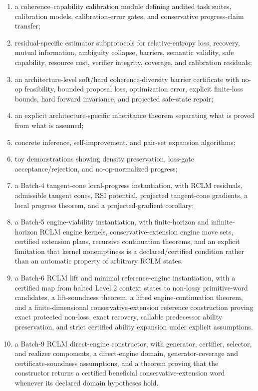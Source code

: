 \documentclass[11pt,a4paper]{article}
\begin{document}
\begin{enumerate}[label=(\arabic*),leftmargin=1.5em]
    \item a coherence--capability calibration module defining audited task suites, calibration models, calibration-error gates, and conservative progress-claim transfer;
    \item residual-specific estimator subprotocols for relative-entropy loss, recovery, mutual information, ambiguity collapse, barriers, semantic validity, safe capability, resource cost, verifier integrity, coverage, and calibration residuals;
    \item an architecture-level soft/hard coherence-diversity barrier certificate with no-op feasibility, bounded proposal loss, optimization error, explicit finite-loss bounds, hard forward invariance, and projected safe-state repair;
    \item an explicit architecture-specific inheritance theorem separating what is proved from what is assumed;
    \item concrete inference, self-improvement, and pair-set expansion algorithms;
    \item toy demonstrations showing density preservation, loss-gate acceptance/rejection, and no-op-normalized progress;
    \item a Batch-4 tangent-cone local-progress instantiation, with RCLM residuals, admissible tangent cones, RSI potential, projected tangent-cone gradients, a local progress theorem, and a projected-gradient corollary;
    \item a Batch-5 engine-viability instantiation, with finite-horizon and infinite-horizon RCLM engine kernels, conservative-extension engine move sets, certified extension plans, recursive continuation theorems, and an explicit limitation that kernel nonemptiness is a declared/certified condition rather than an automatic property of arbitrary RCLM states.
    \item a Batch-6 RCLM lift and minimal reference-engine instantiation, with a certified map from halted Level 2 context states to non-lossy primitive-word candidates, a lift-soundness theorem, a lifted engine-continuation theorem, and a finite-dimensional conservative-extension reference construction proving exact protected non-loss, exact recovery, callable predecessor ability preservation, and strict certified ability expansion under explicit assumptions.
    \item a Batch-9 RCLM direct-engine constructor, with generator, certifier, selector, and realizer components, a direct-engine domain, generator-coverage and certificate-soundness assumptions, and a theorem proving that the constructor returns a certified beneficial conservative-extension word whenever its declared domain hypotheses hold.

\end{enumerate}
\end{document}
